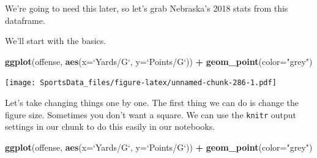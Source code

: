 \documentclass[
]{book}
\newenvironment{Shaded}{\begin{snugshade}}{\end{snugshade}}
\newcommand{\DataTypeTok}[1]{\textcolor[rgb]{0.13,0.29,0.53}{#1}}
\newcommand{\DecValTok}[1]{\textcolor[rgb]{0.00,0.00,0.81}{#1}}
\newcommand{\KeywordTok}[1]{\textcolor[rgb]{0.13,0.29,0.53}{\textbf{#1}}}
\newcommand{\NormalTok}[1]{#1}
\newcommand{\OperatorTok}[1]{\textcolor[rgb]{0.81,0.36,0.00}{\textbf{#1}}}
\newcommand{\StringTok}[1]{\textcolor[rgb]{0.31,0.60,0.02}{#1}}
\begin{document}
\begin{Shaded}
\end{Shaded}

We're going to need this later, so let's grab Nebraska's 2018 stats from this dataframe.

\begin{Shaded}
\end{Shaded}

We'll start with the basics.

\begin{Shaded}
\begin{Highlighting}[]
\KeywordTok{ggplot}\NormalTok{(offense, }\KeywordTok{aes}\NormalTok{(}\DataTypeTok{x=}\StringTok{`}\DataTypeTok{Yards/G}\StringTok{`}\NormalTok{, }\DataTypeTok{y=}\StringTok{`}\DataTypeTok{Points/G}\StringTok{`}\NormalTok{)) }\OperatorTok{+}\StringTok{ }
\StringTok{  }\KeywordTok{geom_point}\NormalTok{(}\DataTypeTok{color=}\StringTok{"grey"}\NormalTok{)}
\end{Highlighting}
\end{Shaded}

\texttt{[image: SportsData\_files/figure-latex/unnamed-chunk-286-1.pdf]}

Let's take changing things one by one. The first thing we can do is change the figure size. Sometimes you don't want a square. We can use the \texttt{knitr} output settings in our chunk to do this easily in our notebooks.

\begin{Shaded}
\begin{Highlighting}[]
\KeywordTok{ggplot}\NormalTok{(offense, }\KeywordTok{aes}\NormalTok{(}\DataTypeTok{x=}\StringTok{`}\DataTypeTok{Yards/G}\StringTok{`}\NormalTok{, }\DataTypeTok{y=}\StringTok{`}\DataTypeTok{Points/G}\StringTok{`}\NormalTok{)) }\OperatorTok{+}\StringTok{ }
\StringTok{  }\KeywordTok{geom_point}\NormalTok{(}\DataTypeTok{color=}\StringTok{"grey"}\NormalTok{)}
\end{Highlighting}
\end{Shaded}
\end{document}
